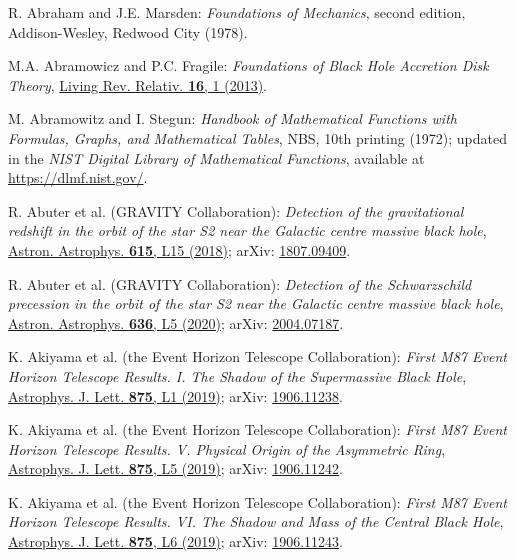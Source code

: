 \begin{thebibliography}{123}

\setlength{\itemsep}{-2pt plus1pt minus1pt}  %

R. Abraham and J.E. Marsden:
{\em Foundations of Mechanics}, second edition,
Addison-Wesley, Redwood City (1978).

M.A. Abramowicz and P.C. Fragile:
{\em Foundations of Black Hole Accretion Disk Theory},
\href{https://doi.org/10.12942/lrr-2013-1}{Living Rev. Relativ. {\bf 16}, 1 (2013)}.

M. Abramowitz and I. Stegun:
{\em Handbook of Mathematical Functions with Formulas, Graphs, and Mathematical Tables},
NBS, 10th printing (1972); updated in the
{\em NIST Digital Library of Mathematical Functions}, available at
\url{https://dlmf.nist.gov/}.

R. Abuter et al. (GRAVITY Collaboration):
{\em Detection of the gravitational redshift in the orbit of the star S2 near the Galactic centre massive black hole},
\href{https://doi.org/10.1051/0004-6361/201833718}{Astron. Astrophys. {\bf 615}, L15 (2018)};
arXiv: \href{https://arxiv.org/abs/1807.09409}{1807.09409}.

R. Abuter et al. (GRAVITY Collaboration):
{\em Detection of the Schwarzschild precession in the orbit of the star
S2 near the Galactic centre massive black hole},
\href{https://doi.org/10.1051/0004-6361/202037813}{Astron. Astrophys. {\bf 636}, L5 (2020)};
arXiv: \href{https://arxiv.org/abs/2004.07187}{2004.07187}.

K. Akiyama et al. (the Event Horizon Telescope Collaboration):
{\em First M87 Event Horizon Telescope Results. I. The Shadow of the Supermassive Black Hole},
\href{https://doi.org/10.3847/2041-8213/ab0ec7}{Astrophys. J. Lett. {\bf 875}, L1 (2019)};
arXiv: \href{https://arxiv.org/abs/1906.11238}{1906.11238}.

K. Akiyama et al. (the Event Horizon Telescope Collaboration):
{\em First M87 Event Horizon Telescope Results. V. Physical Origin of the Asymmetric Ring},
\href{https://doi.org/10.3847/2041-8213/ab0f43}{Astrophys. J. Lett. {\bf 875}, L5 (2019)};
arXiv: \href{https://arxiv.org/abs/1906.11242}{1906.11242}.

K. Akiyama et al. (the Event Horizon Telescope Collaboration):
{\em First M87 Event Horizon Telescope Results. VI. The Shadow and Mass of the Central Black Hole},
\href{https://doi.org/10.3847/2041-8213/ab1141}{Astrophys. J. Lett. {\bf 875}, L6 (2019)};
arXiv: \href{https://arxiv.org/abs/1906.11243}{1906.11243}.


\end{thebibliography}
